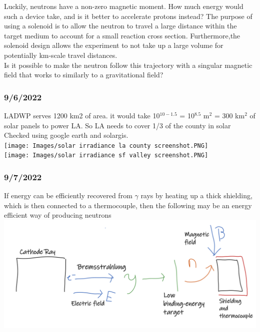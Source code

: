 \documentclass[12pt]{article}
\begin{document}
Luckily, neutrons have a non-zero magnetic moment. How much energy would such a device take, and is it better to accelerate protons instead? The purpose of using a solenoid is to allow the neutron to travel a large distance within the target medium to account for a small reaction cross section. Furthermore,the solenoid design allows the experiment to not take up a large volume for potentially km-scale travel distances. \\
Is it possible to make the neutron follow this trajectory with a singular magnetic field that works to similarly to a gravitational field? 
\subsubsection{9/6/2022}
LADWP serves 1200 km2 of area. 
it would take 10$^{10-1.5}$ = 10$^{8.5}$ m$^2$ = 300 km$^2$ of solar panels to power LA. So LA needs to cover 1/3 of the county in solar\\
Checked using google earth and solargis. \\
\texttt{[image: Images/solar irradiance la county screenshot.PNG]}\\
\texttt{[image: Images/solar irradiance sf valley screenshot.PNG]}
\subsubsection{9/7/2022}
If energy can be efficiently recovered from $\gamma$ rays by heating up a thick shielding, which is then connected to a thermocouple, then the following may be an energy efficient way of producing neutrons\\
\includegraphics[scale=.65]{Images/neutron generator concept.PNG}\\
\end{document}
